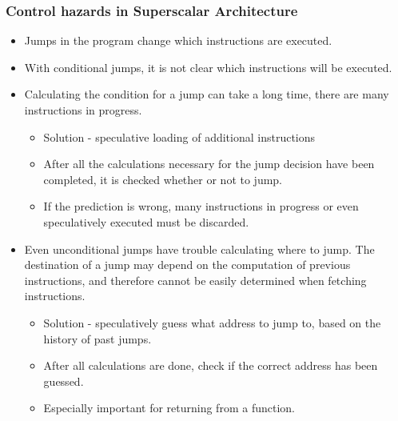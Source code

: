 \documentclass{beamer}
\begin{document}
\begin{frame}
\frametitle{Control hazards in Superscalar Architecture}

\begin{itemize}
\item Jumps in the program change which instructions are executed.
\item With conditional jumps, it is not clear which instructions will be executed.
\item Calculating the condition for a jump can take a long time, there are many instructions in progress.
\begin{itemize}
\item Solution - speculative loading of additional instructions
\item After all the calculations necessary for the jump decision have been completed, it is checked whether or not to jump.
\item If the prediction is wrong, many instructions in progress or even speculatively executed must be discarded.
\end{itemize}
\item Even unconditional jumps have trouble calculating where to jump. The destination of a jump may depend on the computation of previous instructions, and therefore cannot be easily determined when fetching instructions.
\begin{itemize}
\item Solution - speculatively guess what address to jump to, based on the history of past jumps.
\item After all calculations are done, check if the correct address has been guessed.
\item Especially important for returning from a function.
\end{itemize}
\end{itemize}

\end{frame}
\end{document}
